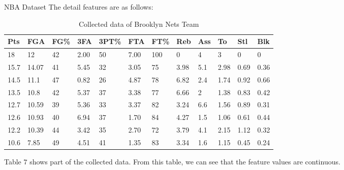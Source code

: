 \documentclass[
 size=14pt,
 paper=smartboard,  %
 mode=present, 		%
 display=slides, 	%
 style=tuliplab,  	%
 pauseslide,
 fleqn,leqno]{powerdot}
\begin{document}
\begin{slide}[toc=,bm=]{NBA Dataset}
The detail features are as follows:

\begin{table}[tb]
\setlength{\abovecaptionskip}{0pt}
\setlength{\belowcaptionskip}{10pt}
\centering
\caption{Collected data of Brooklyn Nets Team}

\begin{tabular}{p{0.9cm}p{0.9cm}p{0.9cm}p{0.9cm}p{0.9cm}p{0.9cm}p{0.9cm}p{0.9cm}p{0.9cm}p{0.9cm}p{0.9cm}p{0.9cm}}
\hline
  Pts & FGA & FG\% & 3FA & 3PT\% & FTA & FT\% & Reb & Ass & To & Stl & Blk \\
\hline
  18   & 12    & 42 &2.00 & 50 & 7.00 & 100& 0& 4& 3& 0& 0 \\
  15.7 & 14.07 & 41 &5.45 & 32 & 3.05 & 75 & 3.98& 5.1& 2.98& 0.69& 0.36\\
  14.5 & 11.1  & 47 &0.82 & 26 & 4.87 & 78 & 6.82& 2.4& 1.74& 0.92& 0.66 \\
  13.5 & 10.8  & 42 &5.37 & 37 & 3.38 & 77 & 6.66& 2& 1.38& 0.83& 0.42 \\
  12.7 & 10.59 & 39 &5.36 & 33 & 3.37 & 82 & 3.24& 6.6& 1.56& 0.89& 0.31 \\
  12.6 & 10.93 & 40 &6.94 & 37 & 1.70 & 84 & 4.27& 1.5& 1.06& 0.61& 0.44 \\
  12.2 & 10.39 & 44 &3.42 & 35 & 2.70 & 72 & 3.79& 4.1& 2.15& 1.12& 0.32 \\
  10.6 & 7.85  & 49 &4.51 & 41 & 1.35 & 83 & 3.34& 1.6& 1.15 & 0.45& 0.24 \\
\hline
\end{tabular}
\end{table}

\begin{note}
Table $7$ shows part of the collected data.
From this table,
we can see that the feature values are continuous.
\end{note}

\end{slide}
\end{document}
